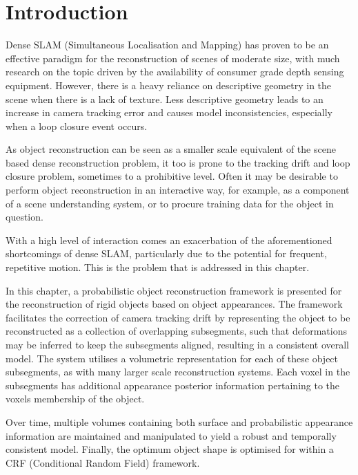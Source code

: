 
\section{Introduction}
\label{sec:probobj_introduction}
Dense SLAM (Simultaneous Localisation and Mapping) has proven to be an effective
paradigm for the reconstruction of scenes of moderate size, with much research
on the topic driven by the availability of consumer grade depth sensing
equipment. However, there is a heavy reliance on descriptive geometry in the
scene when there is a lack of texture. Less descriptive geometry leads to an
increase in camera tracking error and causes model inconsistencies, especially
when a loop closure event occurs.

As object reconstruction can be seen as a smaller scale equivalent of the scene
based dense reconstruction problem, it too is prone to the tracking drift and
loop closure problem, sometimes to a prohibitive level. Often it may be
desirable to perform object reconstruction in an interactive way, for example,
as a component of a scene understanding system, or to procure training data for
the object in question.

With a high level of interaction comes an exacerbation of the aforementioned
shortcomings of dense SLAM, particularly due to the potential for frequent,
repetitive motion. This is the problem that is addressed in this chapter.

In this chapter, a probabilistic object reconstruction framework is presented
for the reconstruction of rigid objects based on object appearances.
The framework facilitates the correction of camera tracking drift by
representing the object to be reconstructed as a collection of overlapping
subsegments, such that deformations may be inferred to keep the subsegments
aligned, resulting in a consistent overall model. The system utilises a
volumetric representation for each of these object subsegments, as with many
larger scale reconstruction systems. Each voxel in the subsegments has
additional appearance posterior information pertaining to the voxels membership
of the object.

Over time, multiple volumes containing both surface and probabilistic appearance
information are maintained and manipulated to yield a robust and temporally
consistent model. Finally, the optimum object shape is optimised for within a
CRF (Conditional Random Field) framework.

